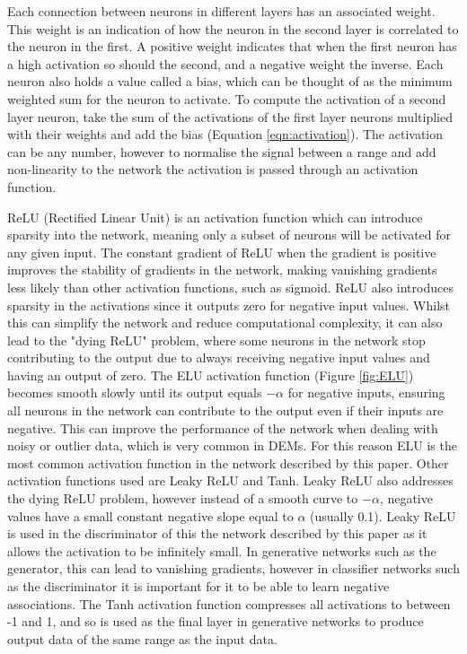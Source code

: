 \documentclass[twocolumn]{article}
\begin{document}
Each connection between neurons in different layers has an associated weight.
This weight is an indication of how the neuron in the second layer is correlated to the neuron in the first.
A positive weight indicates that when the first neuron has a high activation so should the second, and a negative weight the inverse.
Each neuron also holds a value called a bias, which can be thought of as the minimum weighted sum for the neuron to activate.
To compute the activation of a second layer neuron, take the sum of the activations of the first layer neurons multiplied with their weights and add the bias (Equation \ref{eqn:activation}).
The activation can be any number, however to normalise the signal between a range and add non-linearity to the network the activation is passed through an activation function.

ReLU (Rectified Linear Unit) is an activation function which can introduce sparsity into the network, meaning only a subset of neurons will be activated for any given input.
The constant gradient of ReLU when the gradient is positive improves the stability of gradients in the network, making vanishing gradients less likely than other activation functions, such as sigmoid.
ReLU also introduces sparsity in the activations since it outputs zero for negative input values.
Whilst this can simplify the network and reduce computational complexity, it can also lead to the "dying ReLU" problem, where some neurons in the network stop contributing to the output due to always receiving negative input values and having an output of zero.
The ELU activation function (Figure \ref{fig:ELU}) becomes smooth slowly until its output equals \(-\alpha\) for negative inputs, ensuring all neurons in the network can contribute to the output even if their inputs are negative.
This can improve the performance of the network when dealing with noisy or outlier data, which is very common in DEMs.
For this reason ELU is the most common activation function in the network described by this paper.
Other activation functions used are Leaky ReLU and Tanh.
Leaky ReLU also addresses the dying ReLU problem, however instead of a smooth curve to \(-\alpha\), negative values have a small constant negative slope equal to \(\alpha\) (usually 0.1).
Leaky ReLU is used in the discriminator of this the network described by this paper as it allows the activation to be infinitely small.
In generative networks such as the generator, this can lead to vanishing gradients, however in classifier networks such as the discriminator it is important for it to be able to learn negative associations.
The Tanh activation function compresses all activations to between -1 and 1, and so is used as the final layer in generative networks to produce output data of the same range as the input data.
\end{document}
